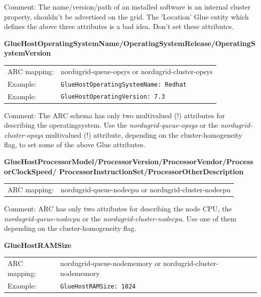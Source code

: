 \documentclass{article}
\begin{document}
Comment: The name/version/path of an installed software is an internal cluster 
property, shouldn't be advertised on the grid. The 'Location' Glue entity 
which defines the above three attributes is a bad idea. Don't set these attributes.


\hspace*{0.5cm}
\begin{shaded}
 \textbf{GlueHostOperatingSystemName/OperatingSystemRelease/OperatingSystemVersion} 
\end{shaded}
\begin{tabular}{lp{10cm}}  
  ARC mapping:&  nordugrid-queue-opsys or nordugrid-cluster-opsys\\
  Example:& \verb#GlueHostOperatingSystemName: Redhat#\\
  Example:& \verb#GlueHostOperatingVersion: 7.3#\\
\end{tabular}

Comment: The ARC schema has only two multivalued (!) attributes for describing the 
operatingsystem. Use the {\it nordugrid-queue-opsys} or the 
{\it nordugrid-cluster-opsys} multivalued (!) attribute,
depending on the cluster-homogeneity flag, to set some of the above Glue attributes.


\hspace*{0.5cm}
\begin{shaded}
 \textbf{GlueHostProcessorModel/ProcessorVersion/ProcessorVendor/ProcessorClockSpeed/
  ProcessorInstructionSet/ProcessorOtherDescription} 
\end{shaded}
\begin{tabular}{lp{10cm}}  
  ARC mapping:& nordugrid-queue-nodecpu or nordugrid-cluster-nodecpu\\  
\end{tabular}

Comment: ARC has only two attributes for describing the node CPU, 
the {\it nordugrid-queue-nodecpu} or the {\it nordugrid-cluster-nodecpu}. 
Use one of them depending on the cluster-homogeneity flag.

 
\hspace*{0.5cm}
\begin{shaded}
 \textbf{GlueHostRAMSize} 
\end{shaded}
\begin{tabular}{lp{10cm}}  
  ARC mapping:& nordugrid-queue-nodememory or nordugrid-cluster-nodememory\\
  Example:& \verb#GlueHostRAMSize: 1024#\\
\end{tabular}
\end{document}
